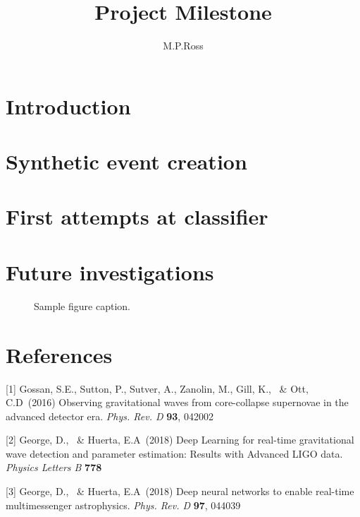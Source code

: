 \documentclass{article}
\title{Project Milestone}
\author{ M.P.Ross}
\begin{document}
\maketitle

\begin{abstract}

\end{abstract}

\section{Introduction}

\section{Synthetic event creation}

\section{First attempts at classifier}

\section{Future investigations}


\begin{figure}
  \centering
  \fbox{\rule[-.5cm]{0cm}{4cm} \rule[-.5cm]{4cm}{0cm}}
  \caption{Sample figure caption.}
\end{figure}


\section*{References}

\medskip

\small

[1] Gossan, S.E., Sutton, P., Sutver, A., Zanolin, M., Gill, K., \ \& Ott, C.D\ (2016) Observing gravitational waves from core-collapse supernovae in the advanced detector era. {\it Phys. Rev. D} {\bf 93}, 042002

[2] George, D., \ \& Huerta, E.A\ (2018) 
Deep Learning for real-time gravitational wave detection and parameter estimation: Results with Advanced LIGO data. {\it Physics Letters B} {\bf 778}

[3] George, D., \ \& Huerta, E.A\ (2018) Deep neural networks to enable real-time multimessenger astrophysics. {\it Phys. Rev. D} {\bf 97}, 044039
\end{document}
